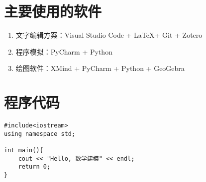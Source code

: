 


\nocite{*}


\appendix
\section{主要使用的软件}

\begin{enumerate}
    \item 文字编辑方案：Visual Studio Code + \LaTeX + Git + Zotero
    \item 程序模拟：PyCharm + Python
    \item 绘图软件：XMind + PyCharm + Python + GeoGebra
\end{enumerate}

\section{程序代码}

\begin{lstlisting}[caption={类的定义语句}]
#include<iostream>
using namespace std;

int main(){
    cout << "Hello, 数学建模" << endl;
    return 0;
}
\end{lstlisting}